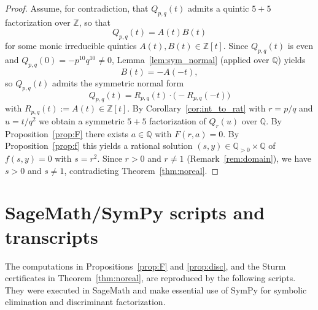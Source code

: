 \documentclass[12pt]{article}
\theoremstyle{remark}
\theoremstyle{definition}
\begin{document}
\begin{proof}
Assume, for contradiction, that $Q_{p,q}(t)$ admits a quintic $5+5$ factorization over $\mathbb{Z}$, so that
\[
Q_{p,q}(t)=A(t)B(t)
\]
for some monic irreducible quintics $A(t),B(t)\in\mathbb{Z}[t]$.
Since $Q_{p,q}(t)$ is even and $Q_{p,q}(0)=-p^{10}q^{10}\neq 0$, Lemma~\ref{lem:sym_normal} (applied over $\mathbb{Q}$) yields
\[
B(t)=-A(-t),
\]
so $Q_{p,q}(t)$ admits the symmetric normal form
\[
Q_{p,q}(t)=R_{p,q}(t)\cdot\bigl(-R_{p,q}(-t)\bigr)
\]
with $R_{p,q}(t):=A(t)\in\mathbb{Z}[t]$.
By Corollary~\ref{cor:int_to_rat} with $r=p/q$ and $u=t/q^2$ we obtain a symmetric $5+5$ factorization of $Q_r(u)$ over $\mathbb{Q}$.
By Proposition~\ref{prop:F} there exists $a\in\mathbb{Q}$ with $F(r,a)=0$.
By Proposition~\ref{prop:f} this yields a rational solution $(s,y)\in\mathbb{Q}_{>0}\times\mathbb{Q}$ of $f(s,y)=0$ with $s=r^2$.
Since $r>0$ and $r\neq 1$ (Remark~\ref{rem:domain}), we have $s>0$ and $s\neq 1$, contradicting Theorem~\ref{thm:noreal}.
\end{proof}


\appendix
\section{SageMath/SymPy scripts and transcripts}\label{app:scripts}

\noindent
The computations in Propositions~\ref{prop:F} and \ref{prop:disc}, and the Sturm certificates in Theorem~\ref{thm:noreal},
are reproduced by the following scripts.
They were executed in SageMath \cite{SageMath} and make essential use of SymPy \cite{SymPy} for symbolic elimination and discriminant factorization.
\end{document}
